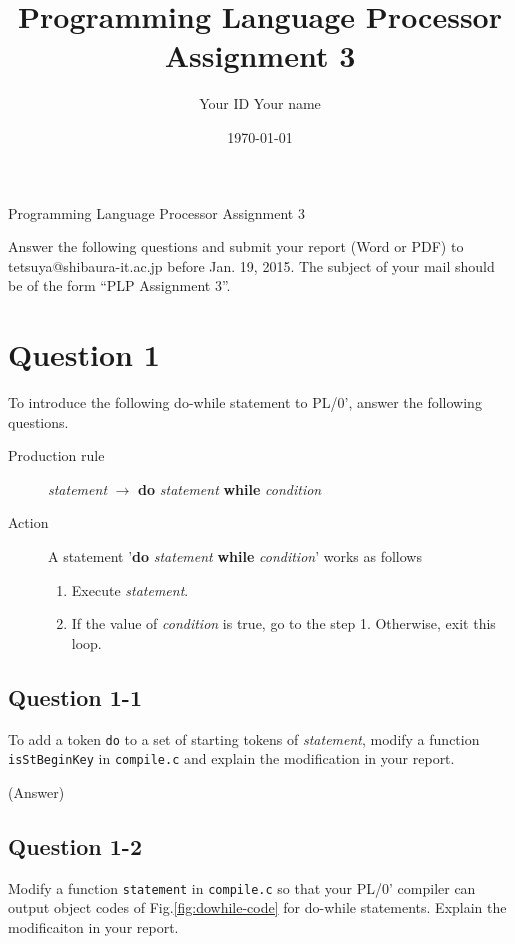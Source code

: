 \documentclass{article}
\title{Programming Language Processor \\ Assignment 3}
\author{Your ID   Your name}
\date{\today}
\begin{document}
\ifreport
\maketitle
\else
\begin{center}
{\huge Programming Language Processor Assignment 3}
\end{center}
Answer the following questions and submit your report (Word or PDF) to
tetsuya@shibaura-it.ac.jp before Jan. 19, 2015. 
The subject of your mail should be of the form ``PLP Assignment 3''.
\fi


\section*{Question 1}

To introduce the following do-while statement to PL/0', answer the following questions.
\begin{description}
 \item[Production rule] {\it statement}  $\to$ {\bf do} {\it statement} {\bf while} {\it condition}
 \item[Action] A statement '{\bf do} {\it statement} {\bf while} {\it condition}' works as follows
	    \begin{enumerate}
	     \item Execute {\it statement}.
	     \item If the value of {\it condition} is true, go to the step 1. Otherwise, exit this loop.
	    \end{enumerate}
\end{description}

\subsection*{Question 1-1}
To add a token {\tt do} to a set of starting tokens of {\it statement},
modify a function {\tt isStBeginKey} in {\tt compile.c} and explain the modification in your report.

\ifreport
(Answer)\\
\fi



\subsection*{Question 1-2}
Modify a function {\tt statement} in {\tt compile.c} 
so that your PL/0' compiler can output object codes of Fig.\ref{fig:dowhile-code} for
do-while statements.
Explain the modificaiton in your report.
\end{document}
